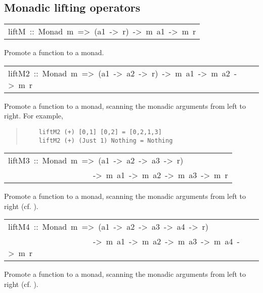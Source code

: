 \subsection{Monadic lifting operators
}
\begin{haddockdesc}
\item[\begin{tabular}{@{}l}
liftM\ ::\ Monad\ m\ =>\ (a1\ ->\ r)\ ->\ m\ a1\ ->\ m\ r
\end{tabular}]\haddockbegindoc
Promote a function to a monad.
\par

\end{haddockdesc}
\begin{haddockdesc}
\item[\begin{tabular}{@{}l}
liftM2\ ::\ Monad\ m\ =>\ (a1\ ->\ a2\ ->\ r)\ ->\ m\ a1\ ->\ m\ a2\ ->\ m\ r
\end{tabular}]\haddockbegindoc
Promote a function to a monad, scanning the monadic arguments from
 left to right.  For example,
\par
\begin{quote}
{\haddockverb\begin{verbatim}
    liftM2 (+) [0,1] [0,2] = [0,2,1,3]
    liftM2 (+) (Just 1) Nothing = Nothing
\end{verbatim}}
\end{quote}

\end{haddockdesc}
\begin{haddockdesc}
\item[\begin{tabular}{@{}l}
liftM3\ ::\ Monad\ m\ =>\ (a1\ ->\ a2\ ->\ a3\ ->\ r)\\\ \ \ \ \ \ \ \ \ \ \ \ \ \ \ \ \ \ \ \ \ ->\ m\ a1\ ->\ m\ a2\ ->\ m\ a3\ ->\ m\ r
\end{tabular}]\haddockbegindoc
Promote a function to a monad, scanning the monadic arguments from
 left to right (cf. ).
\par

\end{haddockdesc}
\begin{haddockdesc}
\item[\begin{tabular}{@{}l}
liftM4\ ::\ Monad\ m\ =>\ (a1\ ->\ a2\ ->\ a3\ ->\ a4\ ->\ r)\\\ \ \ \ \ \ \ \ \ \ \ \ \ \ \ \ \ \ \ \ \ ->\ m\ a1\ ->\ m\ a2\ ->\ m\ a3\ ->\ m\ a4\ ->\ m\ r
\end{tabular}]\haddockbegindoc
Promote a function to a monad, scanning the monadic arguments from
 left to right (cf. ).
\par

\end{haddockdesc}

